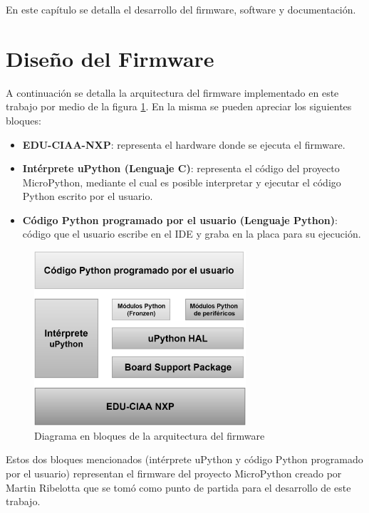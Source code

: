 En este capítulo se detalla el desarrollo del firmware, software y documentación.

\section{Diseño del Firmware}
\label{sec:firmwareArq}

A continuación se detalla la arquitectura del firmware implementado en este trabajo por medio de la figura \ref{fig:firmwareArq}. En la misma se pueden apreciar los siguientes bloques:

\begin{itemize}
	\item \textbf{EDU-CIAA-NXP}: representa el hardware donde se ejecuta el firmware.
	\item \textbf{Intérprete uPython (Lenguaje C)}: representa el código del proyecto MicroPython, mediante el cual es posible interpretar y ejecutar el código Python escrito por el usuario.
	\item \textbf{Código Python programado por el usuario (Lenguaje Python)}: código que el usuario escribe en el IDE y graba en la placa para su ejecución.
\end{itemize}

\begin{figure}[ht]
  \centering
    \includegraphics[width=0.7\textwidth]{Figures/fig_firm_arquitectura}
  \caption{Diagrama en bloques de la arquitectura del firmware}
  \label{fig:firmwareArq}
\end{figure}

Estos dos bloques mencionados (intérprete uPython y código Python programado por el usuario) representan el firmware del proyecto MicroPython creado por Martin Ribelotta que se tomó como punto de partida para el desarrollo de este trabajo. 

